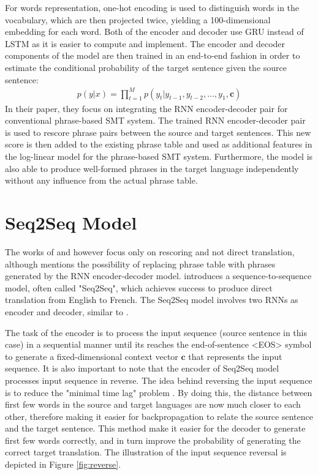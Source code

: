 \documentclass[12pt]{extarticle}
\begin{document}
For words representation, one-hot encoding is used to distinguish words in the vocabulary, which are then projected twice, yielding a 100-dimensional embedding for each word.
Both of the encoder and decoder use GRU instead of LSTM as it is easier to compute and implement. The encoder and decoder components of the model are then trained in an end-to-end fashion in order to estimate the conditional probability of the target sentence given the source sentence: 
\begin{align}
p(y|x) = \prod_{t=1}^{M} p(y_{t} | y_{t-1}, y_{t-2},...,y_{1}, \textbf{c}) \label{eq:19}
\end{align}
In their paper, they focus on integrating the RNN encoder-decoder pair for conventional phrase-based SMT system. The trained RNN encoder-decoder pair is used to rescore phrase pairs between the source and target sentences. This new score is then added to the existing phrase table and used as additional features in the log-linear model for the phrase-based SMT system. Furthermore, the model is also able to produce well-formed phrases in the target language independently without any influence from the actual phrase table.


\section*{Seq2Seq Model}
The works of \citep{kalchbrenner-blunsom-2013-recurrent-continuous} and \citep{cho-etal-2014-learning} however focus only on rescoring and not direct translation, although \citep{cho-etal-2014-learning} mentions the possibility of replacing phrase table with phrases generated by the RNN encoder-decoder model. \citep{Sutskever:2014:SSL:2969033.2969173} introduces a sequence-to-sequence model, often called "Seq2Seq", which achieves success to produce direct translation from English to French. The Seq2Seq model involves two RNNs as encoder and decoder, similar to \citep{cho-etal-2014-learning}.


The task of the encoder is to process the input sequence (source sentence in this case) in a sequential manner until its reaches the end-of-sentence \textless EOS\textgreater{} symbol to generate a fixed-dimensional context vector $\textbf{c}$ that represents the input sequence. It is also important to note that the encoder of Seq2Seq model processes input sequence in reverse. The idea behind reversing the input sequence is to reduce the "minimal time lag" problem \citep{Hochreiter:1996:LSH:2998981.2999048}. By doing this, the distance between first few words in the source and target languages are now much closer to each other, therefore making it easier for backpropagation to relate the source sentence and the target sentence. This method make it easier for the decoder to generate first few words correctly, and in turn improve the probability of generating the correct target translation. The illustration of the input sequence reversal is depicted in Figure \ref{fig:reverse}.
\end{document}
